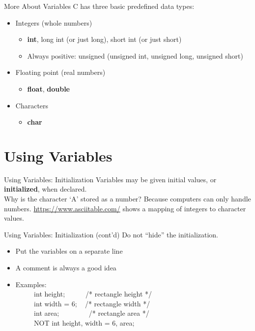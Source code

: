 \documentclass[graphics]{beamer}
\begin{document}
\begin{frame}{More About Variables}
    C has three basic predefined data types:
    \begin{itemize}
        \item Integers (whole numbers)
        \begin{itemize}
            \item \textbf{int}, long int (or just long), short int (or just short)
            \item Always positive: unsigned (unsigned int, unsigned long, unsigned short)
        \end{itemize}
        \item Floating point (real numbers)
        \begin{itemize}
            \item \textbf{float}, \textbf{double}
        \end{itemize}
        \item Characters
        \begin{itemize}
            \item \textbf{char}
        \end{itemize}
    \end{itemize}
\end{frame}

\section{Using Variables}
\begin{frame}{Using Variables: Initialization}
    Variables may be given initial values, or \textbf{initialized}, when declared. \\
    
    
    Why is the character `A' stored as a number? Because computers can only handle numbers.
    \url{https://www.asciitable.com/} shows a mapping of integers to character values.
\end{frame}

\begin{frame}{Using Variables: Initialization (cont'd)}
    Do not ``hide'' the initialization.
    \begin{itemize}
        \item Put the variables on a separate line
        \item A comment is always a good idea
        \item Examples: \\
        ~~ ~~ int height; ~~ ~~ /* rectangle height */ \\
        ~~ ~~ int width = 6; ~ /* rectangle width */ \\
        ~~ ~~ int area; ~~ ~~ ~~ /* rectangle area */ \\
        ~~ ~~ NOT int height, width = 6, area;
    \end{itemize}
\end{frame}
\end{document}
